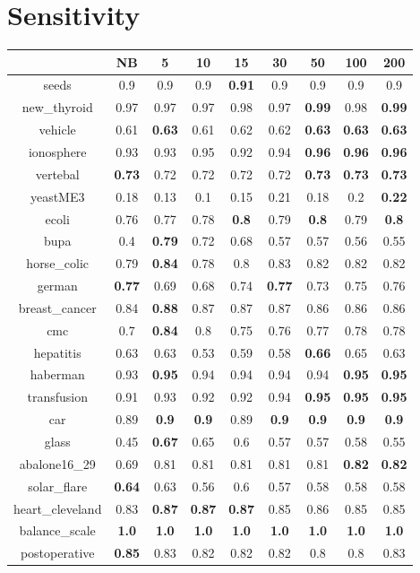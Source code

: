 \documentclass{article}%
\begin{document}
%
\section*{Sensitivity}%
\begin{tabular}{c|cccccccc}%
\hline%
&NB&5&10&15&30&50&100&200\\%
\hline%
seeds&0.9&0.9&0.9&\textbf{0.91}&0.9&0.9&0.9&0.9\\%
new\_thyroid&0.97&0.97&0.97&0.98&0.97&\textbf{0.99}&0.98&\textbf{0.99}\\%
vehicle&0.61&\textbf{0.63}&0.61&0.62&0.62&\textbf{0.63}&\textbf{0.63}&\textbf{0.63}\\%
ionosphere&0.93&0.93&0.95&0.92&0.94&\textbf{0.96}&\textbf{0.96}&\textbf{0.96}\\%
vertebal&\textbf{0.73}&0.72&0.72&0.72&0.72&\textbf{0.73}&\textbf{0.73}&\textbf{0.73}\\%
yeastME3&0.18&0.13&0.1&0.15&0.21&0.18&0.2&\textbf{0.22}\\%
ecoli&0.76&0.77&0.78&\textbf{0.8}&0.79&\textbf{0.8}&0.79&\textbf{0.8}\\%
bupa&0.4&\textbf{0.79}&0.72&0.68&0.57&0.57&0.56&0.55\\%
horse\_colic&0.79&\textbf{0.84}&0.78&0.8&0.83&0.82&0.82&0.82\\%
german&\textbf{0.77}&0.69&0.68&0.74&\textbf{0.77}&0.73&0.75&0.76\\%
breast\_cancer&0.84&\textbf{0.88}&0.87&0.87&0.87&0.86&0.86&0.86\\%
cmc&0.7&\textbf{0.84}&0.8&0.75&0.76&0.77&0.78&0.78\\%
hepatitis&0.63&0.63&0.53&0.59&0.58&\textbf{0.66}&0.65&0.63\\%
haberman&0.93&\textbf{0.95}&0.94&0.94&0.94&0.94&\textbf{0.95}&\textbf{0.95}\\%
transfusion&0.91&0.93&0.92&0.92&0.94&\textbf{0.95}&\textbf{0.95}&\textbf{0.95}\\%
car&0.89&\textbf{0.9}&\textbf{0.9}&0.89&\textbf{0.9}&\textbf{0.9}&\textbf{0.9}&\textbf{0.9}\\%
glass&0.45&\textbf{0.67}&0.65&0.6&0.57&0.57&0.58&0.55\\%
abalone16\_29&0.69&0.81&0.81&0.81&0.81&0.81&\textbf{0.82}&\textbf{0.82}\\%
solar\_flare&\textbf{0.64}&0.63&0.56&0.6&0.57&0.58&0.58&0.58\\%
heart\_cleveland&0.83&\textbf{0.87}&\textbf{0.87}&\textbf{0.87}&0.85&0.86&0.85&0.85\\%
balance\_scale&\textbf{1.0}&\textbf{1.0}&\textbf{1.0}&\textbf{1.0}&\textbf{1.0}&\textbf{1.0}&\textbf{1.0}&\textbf{1.0}\\%
postoperative&\textbf{0.85}&0.83&0.82&0.82&0.82&0.8&0.8&0.83\\%
\end{tabular}
\end{document}
